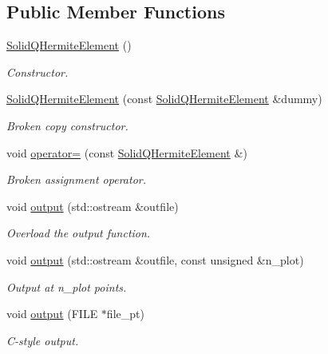 \subsection*{Public Member Functions}
\begin{DoxyCompactItemize}
\item 
\hyperlink{classoomph_1_1SolidQHermiteElement_a9987624a5136fc97791ca0a6f168fc2d}{Solid\+Q\+Hermite\+Element} ()
\begin{DoxyCompactList}\small\item\em Constructor. \end{DoxyCompactList}\item 
\hyperlink{classoomph_1_1SolidQHermiteElement_a6005fefebf60c25f28d7fff7722cca83}{Solid\+Q\+Hermite\+Element} (const \hyperlink{classoomph_1_1SolidQHermiteElement}{Solid\+Q\+Hermite\+Element} \&dummy)
\begin{DoxyCompactList}\small\item\em Broken copy constructor. \end{DoxyCompactList}\item 
void \hyperlink{classoomph_1_1SolidQHermiteElement_ad346e3c85d0b563531d7562e0436352c}{operator=} (const \hyperlink{classoomph_1_1SolidQHermiteElement}{Solid\+Q\+Hermite\+Element} \&)
\begin{DoxyCompactList}\small\item\em Broken assignment operator. \end{DoxyCompactList}\item 
void \hyperlink{classoomph_1_1SolidQHermiteElement_a6459f239b585ae575d779f58f70bae46}{output} (std\+::ostream \&outfile)
\begin{DoxyCompactList}\small\item\em Overload the output function. \end{DoxyCompactList}\item 
void \hyperlink{classoomph_1_1SolidQHermiteElement_ab86bacc26f319f3266e6de9cfc5b82af}{output} (std\+::ostream \&outfile, const unsigned \&n\+\_\+plot)
\begin{DoxyCompactList}\small\item\em Output at n\+\_\+plot points. \end{DoxyCompactList}\item 
void \hyperlink{classoomph_1_1SolidQHermiteElement_ae4f251ca932301e92e1b897cec6f0459}{output} (F\+I\+LE $\ast$file\+\_\+pt)
\begin{DoxyCompactList}\small\item\em C-\/style output. \end{DoxyCompactList}\item 

\end{DoxyCompactItemize}
